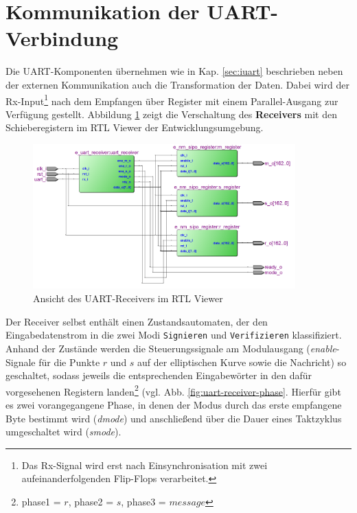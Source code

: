 \section{Kommunikation der UART-Verbindung} \label{sec:uartimpl}

Die UART-Komponenten übernehmen wie in Kap. \ref{sec:iuart} beschrieben neben der externen Kommunikation auch die Transformation der Daten. Dabei wird der Rx-Input\footnote{Das Rx-Signal wird erst nach Einsynchronisation mit zwei aufeinanderfolgenden Flip-Flops verarbeitet.} nach dem Empfangen über Register mit einem Parallel-Ausgang zur Verfügung gestellt. Abbildung \ref{fig:uartrx} zeigt die Verschaltung des \textbf{Receivers} mit den Schieberegistern im RTL Viewer der Entwicklungsumgebung. \\

\begin{figure}[thb]
	\centering
  	\includegraphics[width=0.9\textwidth]{bilder/uart-receiver}
	\caption{Ansicht des UART-Receivers im RTL Viewer}
	\label{fig:uartrx}
\end{figure}

Der Receiver selbst enthält einen Zustandsautomaten, der den Eingabedatenstrom in die zwei Modi \texttt{Signieren} und \texttt{Verifizieren} klassifiziert. Anhand der Zustände werden die Steuerungssignale am Modulausgang (\textit{enable}-Signale für die Punkte $r$ und $s$ auf der elliptischen Kurve sowie die Nachricht) so geschaltet, sodass jeweils die entsprechenden Eingabewörter in den dafür vorgesehenen Registern landen\footnote{phase1 = $r$, phase2 = $s$, phase3 = $message$} (vgl. Abb. \ref{fig:uart-receiver-phase}. Hierfür gibt es zwei vorangegangene Phase, in denen der Modus durch das erste empfangene Byte bestimmt wird (\textit{dmode}) und anschließend über die Dauer eines Taktzyklus umgeschaltet wird (\textit{smode}). \\

